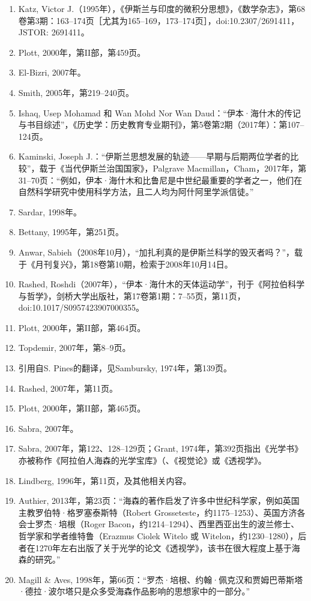 \begin{enumerate}
\item Katz, Victor J.（1995年），《伊斯兰与印度的微积分思想》，《数学杂志》，第68卷第3期：163–174页［尤其为165–169，173–174页］，doi:10.2307/2691411，JSTOR: 2691411。
\item Plott, 2000年，第II部，第459页。
\item El-Bizri, 2007年。
\item Smith, 2005年，第219–240页。
\item Ishaq, Usep Mohamad 和 Wan Mohd Nor Wan Daud：“伊本·海什木的传记与书目综述”，《历史学：历史教育专业期刊》，第5卷第2期（2017年）：第107–124页。
\item Kaminski, Joseph J.：“伊斯兰思想发展的轨迹——早期与后期两位学者的比较”，载于《当代伊斯兰治国国家》，Palgrave Macmillan，Cham，2017年，第31–70页：“例如，伊本·海什木和比鲁尼是中世纪最重要的学者之一，他们在自然科学研究中使用科学方法，且二人均为阿什阿里学派信徒。”
\item Sardar, 1998年。
\item Bettany, 1995年，第251页。
\item Anwar, Sabieh（2008年10月），“加扎利真的是伊斯兰科学的毁灭者吗？”，载于《月刊复兴》，第18卷第10期，检索于2008年10月14日。
\item Rashed, Roshdi（2007年），“伊本·海什木的天体运动学”，刊于《阿拉伯科学与哲学》，剑桥大学出版社，第17卷第1期：7–55页，第11页，doi:10.1017/S0957423907000355。
\item Plott, 2000年，第II部，第464页。
\item Topdemir, 2007年，第8–9页。
\item 引用自S. Pines的翻译，见Sambursky, 1974年，第139页。
\item Rashed, 2007年，第11页。
\item Plott, 2000年，第II部，第465页。
\item Sabra, 2007年。
\item Sabra, 2007年，第122、128–129页；Grant, 1974年，第392页指出《光学书》亦被称作《阿拉伯人海森的光学宝库》（、《视觉论》或《透视学》。
\item Lindberg, 1996年，第11页，及其他相关内容。
\item Authier, 2013年，第23页：“海森的著作启发了许多中世纪科学家，例如英国主教罗伯特·格罗塞泰斯特（Robert Grosseteste，约1175–1253）、英国方济各会士罗杰·培根（Roger Bacon，约1214–1294）、西里西亚出生的波兰修士、哲学家和学者维特鲁（Erazmus Ciolek Witelo 或 Witelon，约1230–1280），后者在1270年左右出版了关于光学的论文《透视学》，该书在很大程度上基于海森的研究。”
\item Magill & Aves, 1998年，第66页：“罗杰·培根、约翰·佩克汉和贾姆巴蒂斯塔·德拉·波尔塔只是众多受海森作品影响的思想家中的一部分。”

\end{enumerate}
